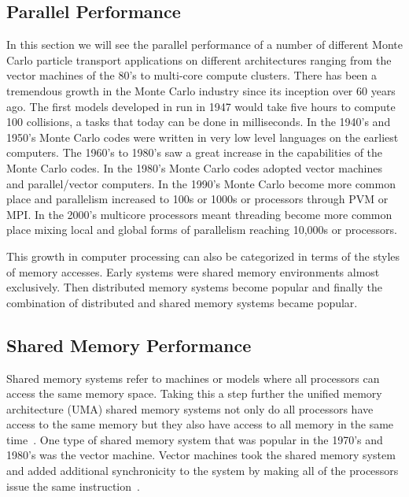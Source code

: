 \subsection{ \textbf{ Parallel Performance }}

In this section we will see the parallel performance of a number of different Monte Carlo particle transport applications on different architectures ranging from the vector machines of the 80's to multi-core compute clusters.
%
There has been a tremendous growth in the Monte Carlo industry since its inception over 60 years ago.
%
The first models developed in run in 1947 would take five hours to compute 100 collisions, a tasks that today can be done in milliseconds.
%
In the 1940's and 1950's Monte Carlo codes were written in very low level languages on the earliest computers.
%
The 1960's to 1980's saw a great increase in the capabilities of the Monte Carlo codes.
%
In the 1980's Monte Carlo codes adopted vector machines and parallel/vector computers.
%
In the 1990's Monte Carlo become more common place and parallelism increased to 100s or 1000s or processors through PVM or MPI.
%
In the 2000's multicore processors meant threading become more common place mixing local and global forms of parallelism reaching 10,000s or processors.~\cite{brown2011recent}
%

This growth in computer processing can also be categorized in terms of the styles of memory accesses.
%
Early systems were shared memory environments almost exclusively.
%
Then distributed memory systems become popular and finally the combination of distributed and shared memory systems became popular.
%

\subsection*{ \textbf{Shared Memory Performance}} 

Shared memory systems refer to machines or models where all processors can access the same memory space.
%
Taking this a step further the unified memory architecture (UMA) shared memory systems not only do all processors have access to the same memory but they also have access to all memory in  the same time~\cite{el2005advanced}.
%
One type of shared memory system that was popular in the 1970's and 1980's was the vector machine.
%
Vector machines took the shared memory system and added additional synchronicity to the system by making all of the processors issue the same instruction~\cite{russell1978cray}.
%

